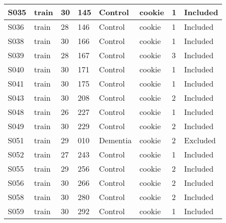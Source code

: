 \begin{center}
\begin{longtable}{|l|l|l|l|l|l|l|l|}
S035           & train                 & 30              & 145     & Control        & cookie          & 1            & Included      \\ \hline
S036           & train                 & 28              & 146     & Control        & cookie          & 1            & Included      \\ \hline
S038           & train                 & 30              & 166     & Control        & cookie          & 1            & Included      \\ \hline
S039           & train                 & 28              & 167     & Control        & cookie          & 3            & Included      \\ \hline
S040           & train                 & 30              & 171     & Control        & cookie          & 1            & Included      \\ \hline
S041           & train                 & 30              & 175     & Control        & cookie          & 1            & Included      \\ \hline
S043           & train                 & 30              & 208     & Control        & cookie          & 2            & Included      \\ \hline
S048           & train                 & 26              & 227     & Control        & cookie          & 1            & Included      \\ \hline
S049           & train                 & 30              & 229     & Control        & cookie          & 2            & Included      \\ \hline
S051           & train                 & 29              & 010     & Dementia       & cookie          & 2            & Excluded      \\ \hline
S052           & train                 & 27              & 243     & Control        & cookie          & 1            & Included      \\ \hline
S055           & train                 & 29              & 256     & Control        & cookie          & 2            & Included      \\ \hline
S056           & train                 & 30              & 266     & Control        & cookie          & 2            & Included      \\ \hline
S058           & train                 & 30              & 280     & Control        & cookie          & 2            & Included      \\ \hline
S059           & train                 & 30              & 292     & Control        & cookie          & 1            & Included      \\ \hline

\end{longtable}
\end{center}
